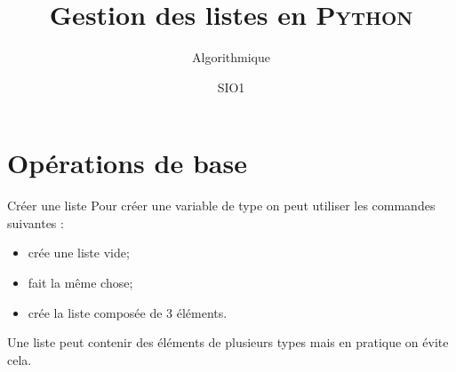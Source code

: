 \documentclass[10pt]{beamer}
\title{Gestion des listes en \textsc{Python}}
\subtitle{Algorithmique}
\author{SIO1}
\begin{document}
\maketitle
\section{Opérations de base}

\begin{frame}[fragile]{Créer une liste}\pause
Pour créer une variable de type  on peut utiliser les commandes suivantes :\pause
\begin{itemize}
\item {} crée une liste vide;\pause
\item {} fait la même chose;\pause
\item   {} crée la liste composée de 3 éléments.\pause
\end{itemize}
Une liste peut contenir des éléments de plusieurs types mais en pratique on évite cela.
\end{frame}
\end{document}
